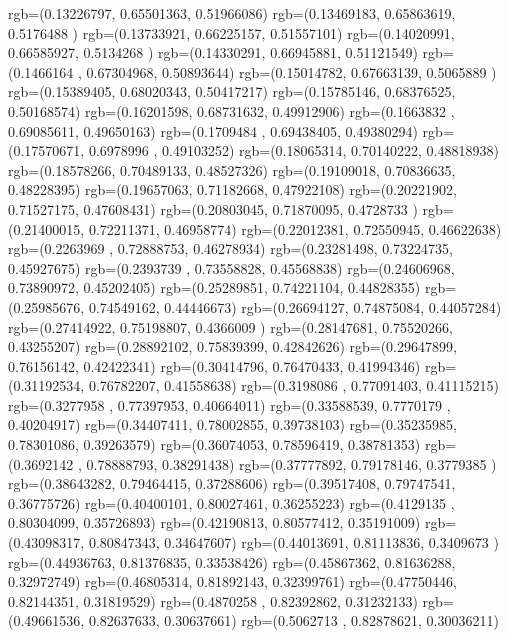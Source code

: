 {{{		  rgb=(0.13226797,  0.65501363,  0.51966086)
		  rgb=(0.13469183,  0.65863619,  0.5176488 )
		  rgb=(0.13733921,  0.66225157,  0.51557101)
		  rgb=(0.14020991,  0.66585927,  0.5134268 )
		  rgb=(0.14330291,  0.66945881,  0.51121549)
		  rgb=(0.1466164 ,  0.67304968,  0.50893644)
		  rgb=(0.15014782,  0.67663139,  0.5065889 )
		  rgb=(0.15389405,  0.68020343,  0.50417217)
		  rgb=(0.15785146,  0.68376525,  0.50168574)
		  rgb=(0.16201598,  0.68731632,  0.49912906)
		  rgb=(0.1663832 ,  0.69085611,  0.49650163)
		  rgb=(0.1709484 ,  0.69438405,  0.49380294)
		  rgb=(0.17570671,  0.6978996 ,  0.49103252)
		  rgb=(0.18065314,  0.70140222,  0.48818938)
		  rgb=(0.18578266,  0.70489133,  0.48527326)
		  rgb=(0.19109018,  0.70836635,  0.48228395)
		  rgb=(0.19657063,  0.71182668,  0.47922108)
		  rgb=(0.20221902,  0.71527175,  0.47608431)
		  rgb=(0.20803045,  0.71870095,  0.4728733 )
		  rgb=(0.21400015,  0.72211371,  0.46958774)
		  rgb=(0.22012381,  0.72550945,  0.46622638)
		  rgb=(0.2263969 ,  0.72888753,  0.46278934)
		  rgb=(0.23281498,  0.73224735,  0.45927675)
		  rgb=(0.2393739 ,  0.73558828,  0.45568838)
		  rgb=(0.24606968,  0.73890972,  0.45202405)
		  rgb=(0.25289851,  0.74221104,  0.44828355)
		  rgb=(0.25985676,  0.74549162,  0.44446673)
		  rgb=(0.26694127,  0.74875084,  0.44057284)
		  rgb=(0.27414922,  0.75198807,  0.4366009 )
		  rgb=(0.28147681,  0.75520266,  0.43255207)
		  rgb=(0.28892102,  0.75839399,  0.42842626)
		  rgb=(0.29647899,  0.76156142,  0.42422341)
		  rgb=(0.30414796,  0.76470433,  0.41994346)
		  rgb=(0.31192534,  0.76782207,  0.41558638)
		  rgb=(0.3198086 ,  0.77091403,  0.41115215)
		  rgb=(0.3277958 ,  0.77397953,  0.40664011)
		  rgb=(0.33588539,  0.7770179 ,  0.40204917)
		  rgb=(0.34407411,  0.78002855,  0.39738103)
		  rgb=(0.35235985,  0.78301086,  0.39263579)
		  rgb=(0.36074053,  0.78596419,  0.38781353)
		  rgb=(0.3692142 ,  0.78888793,  0.38291438)
		  rgb=(0.37777892,  0.79178146,  0.3779385 )
		  rgb=(0.38643282,  0.79464415,  0.37288606)
		  rgb=(0.39517408,  0.79747541,  0.36775726)
		  rgb=(0.40400101,  0.80027461,  0.36255223)
		  rgb=(0.4129135 ,  0.80304099,  0.35726893)
		  rgb=(0.42190813,  0.80577412,  0.35191009)
		  rgb=(0.43098317,  0.80847343,  0.34647607)
		  rgb=(0.44013691,  0.81113836,  0.3409673 )
		  rgb=(0.44936763,  0.81376835,  0.33538426)
		  rgb=(0.45867362,  0.81636288,  0.32972749)
		  rgb=(0.46805314,  0.81892143,  0.32399761)
		  rgb=(0.47750446,  0.82144351,  0.31819529)
		  rgb=(0.4870258 ,  0.82392862,  0.31232133)
		  rgb=(0.49661536,  0.82637633,  0.30637661)
		  rgb=(0.5062713 ,  0.82878621,  0.30036211)
}}}
